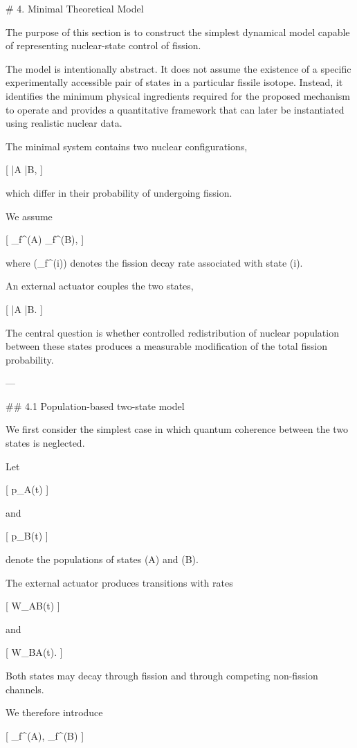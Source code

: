 # 4. Minimal Theoretical Model

The purpose of this section is to construct the simplest dynamical model capable of representing nuclear-state control of fission.

The model is intentionally abstract. It does not assume the existence of a specific experimentally accessible pair of states in a particular fissile isotope. Instead, it identifies the minimum physical ingredients required for the proposed mechanism to operate and provides a quantitative framework that can later be instantiated using realistic nuclear data.

The minimal system contains two nuclear configurations,

[
|A\rangle
\qquad{}\qquad
|B\rangle ,
]

which differ in their probability of undergoing fission.

We assume

[
\Gamma_f^{(A)}
\neq
\Gamma_f^{(B)},
]

where (\Gamma_f^{(i)}) denotes the fission decay rate associated with state (i).

An external actuator couples the two states,

[
|A\rangle
{}
|B\rangle .
]

The central question is whether controlled redistribution of nuclear population between these states produces a measurable modification of the total fission probability.

---

## 4.1 Population-based two-state model

We first consider the simplest case in which quantum coherence between the two states is neglected.

Let

[
p_A(t)
]

and

[
p_B(t)
]

denote the populations of states (A) and (B).

The external actuator produces transitions with rates

[
W_{A\rightarrow B}(t)
]

and

[
W_{B\rightarrow A}(t).
]

Both states may decay through fission and through competing non-fission channels.

We therefore introduce

[
\Gamma_f^{(A)},\qquad
\Gamma_f^{(B)}
]

